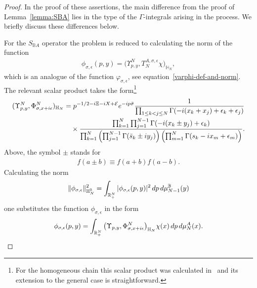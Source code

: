 \documentclass[11pt]{article}
\numberwithin{equation}{section}
\numberwithin{equation}{section}
\begin{document}
\begin{proof}
In the proof of these assertions, the main difference from the proof of Lemma~\ref{lemma:SBA} lies in the type of the $\Gamma$-integrals
arising in the process. We briefly discuss these differences below.



For the $S_{\mathbb B A}$ operator the problem is reduced to calculating the norm of the function
\begin{gather*}
\phi_{\sigma,\epsilon}(p,y)= \big( \Upsilon^N_{p,y},T_N^{A,\sigma,\epsilon}\chi \big)_{ \mathbb{H}_N },
\end{gather*}
which is an analogue of the function $\varphi_{\sigma,\epsilon}$, see equation~\eqref{varphi-def-and-norm}. The relevant scalar product takes the
form\footnote{For the homogeneous chain this scalar product was calculated in~\cite{DMspinchainandSL2RGustafson} and its extension to the
general case is straightforward.}
\begin{gather*}
(\Upsilon^N_{p,y},\Phi^N_{\sigma,x+{\rm i}\epsilon})_{ \mathbb{H}_N }
= p^{-1/2 -{\rm i}\Xi-{\rm i}X+\mathcal E}{\rm e}^{-{\rm i}p\bar\sigma}
\frac1{ \prod_{1\leq k<j\leq N}\Gamma(-{\rm i}( x_k+ x_j)+\epsilon_k+\epsilon_j) }
\\ \hphantom{(\Upsilon^N_{p,y},\Phi^N_{\sigma,x+{\rm i}\epsilon})_{ \mathbb{H}_N }=}
{}\times \frac{\prod_{k=1}^{N}\prod_{j=1}^{N-1} \Gamma(-{\rm i}(x_k\pm y_j)+\epsilon_k)}{
\prod_{k=1}^N\left(\prod_{j=1}^{N-1} \Gamma(\bar s_k\pm {\rm i}y_j)\right) \left(\prod_{m=1}^{N}\Gamma( s_k-{\rm i}x_m+\epsilon_m)\right)}.
\end{gather*}
 Above, the symbol $\pm$ stands for
\begin{gather*}
f(a \pm b) \equiv f(a+b)f(a-b) .
\end{gather*}
Calculating the norm
\begin{gather*}
\|\phi_{\sigma,\epsilon}\|^2_{\mathbb H_N^{\mathbb B}} =\int_{\mathbb R_+^N}
 |\phi_{\sigma,\epsilon}(p,y)|^2 \,{\rm d}p \,{\rm d}\mu_{N-1}^{\mathbb B}(y)
\end{gather*}
one substitutes the function $\phi_{\sigma,\epsilon}$ in the form
\begin{gather*}
\phi_{\sigma,\epsilon}(p,y)=\int_{\mathbb R_+^N} \big( \Upsilon_{p,y},\Phi^N_{\sigma,x+{\rm i}\epsilon}\big)_{ \mathbb{H}_N } \chi(x) \,{\rm d}p\,{\rm d}\mu_N^A(x).
\end{gather*}

\end{proof}
\end{document}
